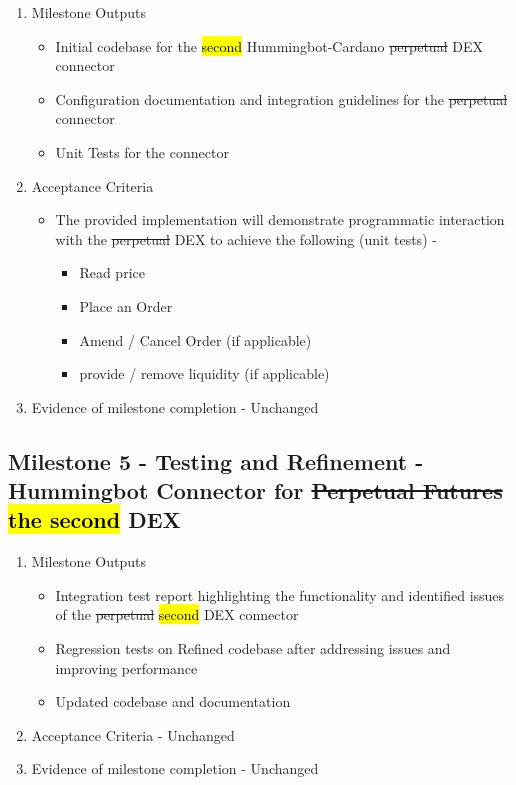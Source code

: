 \documentclass{article}
\begin{document}
\begin{enumerate}
    \item Milestone Outputs
    \begin{itemize}
        \item Initial codebase for the \hl{second} Hummingbot-Cardano \st{perpetual} DEX connector 
        \item Configuration documentation and integration guidelines for the \st{perpetual} connector
        \item Unit Tests for the connector
    \end{itemize}    

    \item Acceptance Criteria
    
    \begin{itemize}
        \item The provided implementation will demonstrate programmatic interaction with the \st{perpetual} DEX to achieve the following (unit tests) - \begin{itemize}
            \item Read price 
            \item Place an Order
            \item Amend / Cancel Order (if applicable)
            \item provide / remove liquidity (if applicable)
        \end{itemize}        
    \end{itemize}
    
    \item Evidence of milestone completion - Unchanged
\end{enumerate}

\subsection*{Milestone 5 - Testing and Refinement - Hummingbot Connector for \st{Perpetual Futures} \hl{the second} DEX}

\begin{enumerate}
    \item Milestone Outputs
    \begin{itemize}
        \item Integration test report highlighting the functionality and identified issues of the \st{perpetual} \hl{second} DEX connector 
        \item Regression tests on Refined codebase after addressing issues and improving performance
        \item Updated codebase and documentation
    \end{itemize}    

    \item Acceptance Criteria - Unchanged
    
    \item Evidence of milestone completion - Unchanged
\end{enumerate}
\end{document}
